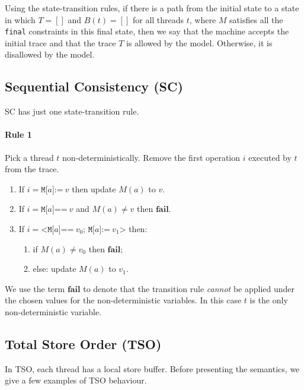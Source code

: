 \documentclass[11pt]{article}
\begin{document}
Using the state-transition rules, if there is a path from the initial
state to a state in which $T = []$ and $B(t) = []$ for all threads
$t$, where $M$ satisfies all the \verb#final# constraints in this
final state, then we say that the machine accepts the initial trace
and that the trace $T$ is allowed by the model.  Otherwise, it is
disallowed by the model.

\subsection{Sequential Consistency (SC)}

SC has just one state-transition rule.

\paragraph{Rule 1}

Pick a thread $t$ non-deterministically.  Remove the first operation
$i$ executed by $t$ from the trace.

\begin{enumerate}
\item
     If $i = \texttt{M[}a\texttt{]:=}~v$ then update $M(a)$ to $v$.

\item
     If $i = \texttt{M[}a\texttt{]==}~v$ and $M(a) \neq v$
     then $\textbf{fail}$.

\item
     If $i = \texttt{<M[}a\texttt{]==}~v_0\texttt{; M[}a\texttt{]:=}~v_1
     \texttt{>}$ then:

\begin{enumerate}[i]
\item
          if $M(a) \neq v_0$ then $\textbf{fail}$;
\item
          else: update $M(a)$ to $v_1$.
\end{enumerate}
\end{enumerate}

\noindent We use the term $\textbf{fail}$ to denote that the
transition rule \emph{cannot} be applied under the chosen values for
the non-deterministic variables.  In this case $t$ is the only
non-deterministic variable.  

\subsection{Total Store Order (TSO)}

In TSO, each thread has a local store buffer.  Before presenting the
semantics, we give a few examples of TSO behaviour.
\end{document}
